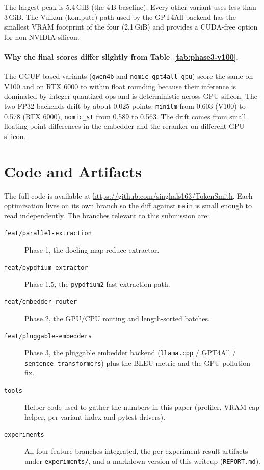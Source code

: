 \documentclass[sigconf]{acmart}
\begin{document}
The largest peak is 5.4\,GiB (the 4\,B baseline). Every other variant
uses less than 3\,GiB. The Vulkan (kompute) path used by the GPT4All
backend has the smallest VRAM footprint of the four (2.1\,GiB) and
provides a CUDA-free option for non-NVIDIA silicon.

\paragraph{Why the final scores differ slightly from
Table~\ref{tab:phase3-v100}.}
The GGUF-based variants (\texttt{qwen4b} and
\texttt{nomic\_gpt4all\_gpu}) score the same on V100 and on RTX 6000
to within float rounding because their
inference is dominated by integer-quantized ops and is deterministic across GPU silicon. The two FP32 backends drift by about
0.025 points: \texttt{minilm} from 0.603 (V100) to 0.578 (RTX 6000),
\texttt{nomic\_st} from 0.589 to 0.563. 
The drift comes from small floating-point differences in the embedder
and the reranker on different GPU silicon.

\section{Code and Artifacts}

The full code is available at
\url{https://github.com/singhals163/TokenSmith}. Each optimization
lives on its own branch so the diff against \texttt{main} is small
enough to read independently. The branches relevant to this
submission are:

\begin{description}
\item[\texttt{feat/parallel-extraction}] Phase 1, the docling
  map-reduce extractor.
\item[\texttt{feat/pypdfium-extractor}] Phase 1.5, the
  \texttt{pypdfium2} fast extraction path.
\item[\texttt{feat/embedder-router}] Phase 2, the GPU/CPU routing and
  length-sorted batches.
\item[\texttt{feat/pluggable-embedders}] Phase 3, the pluggable
  embedder backend (\texttt{llama.cpp} / GPT4All /
  \texttt{sentence-transformers}) plus the BLEU metric and the
  GPU-pollution fix.
\item[\texttt{tools}] Helper code used to gather the numbers in this
  paper (profiler, VRAM cap helper, per-variant index and pytest
  drivers).
\item[\texttt{experiments}] All four feature branches integrated, the
  per-experiment result artifacts under \texttt{experiments/}, and a
  markdown version of this writeup (\texttt{REPORT.md}).
\end{description}
\end{document}
